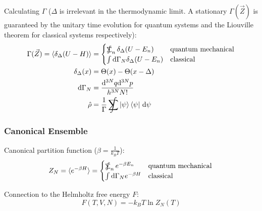 			\noindent
			Calculating $\Gamma$ ($\Delta$ is irrelevant in the thermodynamic limit. A stationary $\Gamma(\vec{Z})$ is guaranteed by the unitary time evolution for quantum systems and the Liouville theorem for classical systems respectively):
			\begin{equation}
				\begin{aligned}
					\Gamma(\vec{Z}) = \langle \delta_\Delta (U-H) \rangle
						&= \begin{cases}
								\SumInt_n \delta_\Delta(U-E_n) & \text{quantum mechanical} \\
								\int \diff \Gamma_N \delta_\Delta(U-E_n) & \text{classical}
							\end{cases} \\
					\delta_\Delta(x) &= \Theta(x) - \Theta(x-\Delta)\\
					\diff \Gamma_N &= \frac{\diff^{3N}q \diff^{3N}p }{h^{3N} N!} \\
					\hat{\rho} &= \frac{1}{\Gamma} \SumInt \Ket{\psi}\Bra{\psi}\,\diff\psi
				\end{aligned}
			\end{equation}

		\subsubsection{Canonical Ensemble}
			\noindent
			Canonical partition function ($\beta = \frac{1}{k_B T}$):
			\begin{equation}
				Z_N=\langle e^{-\beta H} \rangle
					= \begin{cases}
							\SumInt_n e^{-\beta E_n} & \text{quantum mechanical} \\
							\int \diff \Gamma_N e^{-\beta H} & \text{classical}
						\end{cases} \\
			\end{equation}

			\noindent
			Connection to the Helmholtz free energy $F$:
			\begin{equation}
				F(T, V, N) = -k_B T \ln{Z_N(T)}
			\end{equation}


